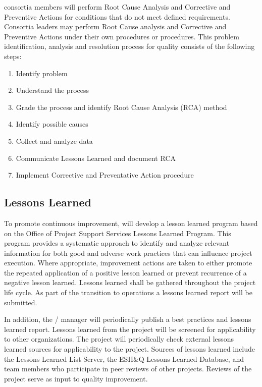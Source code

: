  consortia members will perform Root Cause Analysis and Corrective
and Preventive Actions for conditions that do not meet defined
requirements. Consortia leaders may perform Root Cause analysis and
Corrective and Preventive Actions under their own procedures or
\fnal procedures.  This problem identification, analysis and
resolution process for quality consists of the following steps:
\begin{enumerate}
 \item Identify problem
 \item Understand the process
 \item Grade the process and identify Root Cause Analysis (RCA) method
 \item Identify possible causes
 \item Collect and analyze data
 \item Communicate Lessons Learned and document RCA
 \item Implement Corrective and Preventative Action procedure
\end{enumerate}

\subsection{Lessons Learned}
\label{sec:lessons_learned}

To promote continuous improvement,   will develop a
lesson learned program based on the \fnal Office of Project Support
Services Lessons Learned Program. This program provides a systematic
approach to identify and analyze relevant information for both good
and adverse work practices that can influence project execution. Where
appropriate, improvement actions are taken to either promote the
repeated application of a positive lesson learned or prevent
recurrence of a negative lesson learned. Lessons learned shall be
gathered throughout the project life cycle. As part of the transition
to operations a lessons learned report will be submitted.

In addition, the /  manager will
periodically publish a best practices and lessons learned
report. Lessons learned from the  project will be screened
for applicability to other organizations. The  project
will periodically check external lessons learned sources for
applicability to the  project. Sources of lessons learned
include the  Lessons Learned List Server, the \fnal ESH\&Q
Lessons Learned Database, and  team members who
participate in peer reviews of other projects. Reviews of the
 project serve as input to quality improvement.

